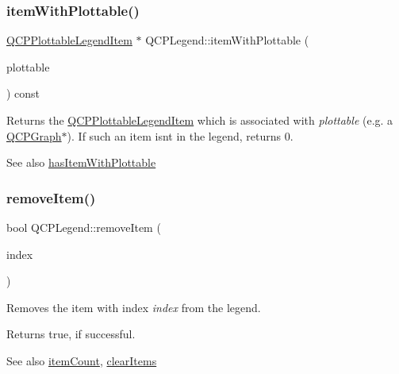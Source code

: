 \subsubsection{\texorpdfstring{item\+With\+Plottable()}{itemWithPlottable()}}
{\footnotesize\ttfamily \mbox{\hyperlink{class_q_c_p_plottable_legend_item}{Q\+C\+P\+Plottable\+Legend\+Item}} $\ast$ Q\+C\+P\+Legend\+::item\+With\+Plottable (\begin{DoxyParamCaption}\item[{const \mbox{\hyperlink{class_q_c_p_abstract_plottable}{Q\+C\+P\+Abstract\+Plottable}} $\ast$}]{plottable }\end{DoxyParamCaption}) const}

Returns the \mbox{\hyperlink{class_q_c_p_plottable_legend_item}{Q\+C\+P\+Plottable\+Legend\+Item}} which is associated with {\itshape plottable} (e.\+g. a \mbox{\hyperlink{class_q_c_p_graph}{Q\+C\+P\+Graph}}$\ast$). If such an item isn\textquotesingle{}t in the legend, returns 0.

\begin{DoxySeeAlso}{See also}
\mbox{\hyperlink{class_q_c_p_legend_a4b90a442af871582df85c2bc13f91e88}{has\+Item\+With\+Plottable}} 
\end{DoxySeeAlso}
\mbox{\label{class_q_c_p_legend_ac91595c3eaa746fe6321d2eb952c63bb}} 
\subsubsection{\texorpdfstring{remove\+Item()}{removeItem()}\hspace{0.1cm}{\footnotesize\ttfamily [1/2]}}
{\footnotesize\ttfamily bool Q\+C\+P\+Legend\+::remove\+Item (\begin{DoxyParamCaption}\item[{int}]{index }\end{DoxyParamCaption})}

Removes the item with index {\itshape index} from the legend.

Returns true, if successful.

\begin{DoxySeeAlso}{See also}
\mbox{\hyperlink{class_q_c_p_legend_a57ab86ab8b2a3762d4c1455eb5452c88}{item\+Count}}, \mbox{\hyperlink{class_q_c_p_legend_a24795c7250eb5214fcea16b7217b4dfb}{clear\+Items}} 
\end{DoxySeeAlso}
\mbox{\label{class_q_c_p_legend_a2aea4ec6da2d454dd0b241a254d65082}} 
